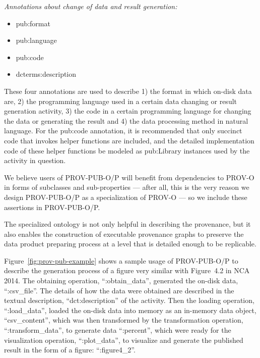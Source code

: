 \noindent\emph{Annotations about change of data and result generation:}
\begin{itemize}
	\item pub:format
	\item pub:language%
	\item pub:code%
	\item dcterms:description%
\end{itemize}
These four annotations are used to describe 1) the format in which on-disk data are, 2) the programming language used in a certain data changing or result generation activity, 3) the code in a certain programming language for changing the data or generating the result and 4) the data processing method in natural language. For the pub:code annotation, it is recommended that only succinct code that invokes helper functions are included, and the detailed implementation code of these helper functions be modeled as pub:Library instances used by the activity in question.

We believe users of PROV-PUB-O/P will benefit from dependencies to PROV-O in forms of subclasses and sub-properties --- after all, this is the very reason we design PROV-PUB-O/P as a specialization of PROV-O --- so we include these assertions in PROV-PUB-O/P.

The specialized ontology is not only helpful in describing the provenance, but it also enables the construction of executable provenance graphs to preserve the data product preparing process at a level that is detailed enough to be replicable.

Figure~\ref{fig:prov-pub-example} shows a sample usage of PROV-PUB-O/P to describe the generation process of a figure very similar with Figure~4.2 in NCA 2014. The obtaining operation, ``:obtain\_data'', generated the on-disk data, ``:csv\_file''. The details of how the data were obtained are described in the textual description, ``dct:description'' of the activity. Then the loading operation, ``:load\_data'', loaded the on-disk data into memory as an in-memory data object, ``csv\_content'', which was then transformed by the transformation operation, ``:transform\_data'', to generate data ``:percent'', which were ready for the visualization operation, ``:plot\_data'', to visualize and generate the published result in the form of a figure: ``:figure4\_2''. 

